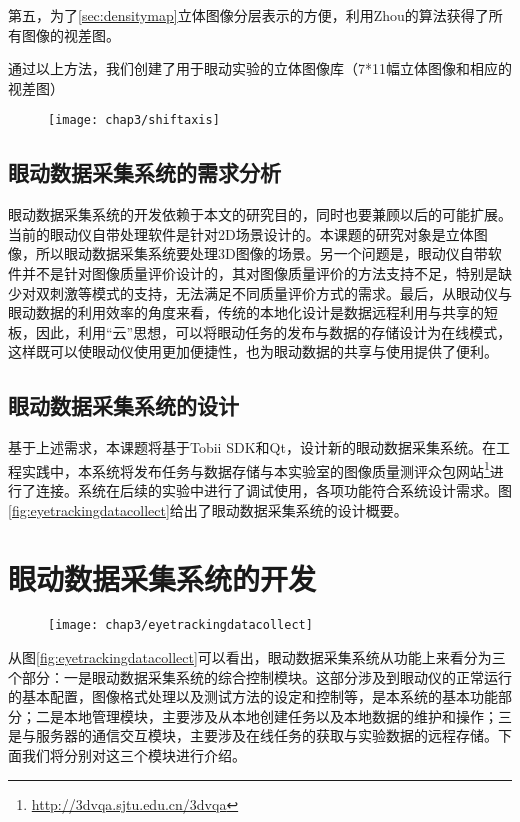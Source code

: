 第五，为了\ref{sec:densitymap}立体图像分层表示的方便，利用Zhou\parencite{zhou2015depth}的算法获得了所有图像的视差图。

通过以上方法，我们创建了用于眼动实验的立体图像库（7*11幅立体图像和相应的视差图）
\begin{figure}[!htp]
  \centering
  \texttt{[image: chap3/shiftaxis]}
\end{figure}
\subsection{眼动数据采集系统的需求分析}
\label{sec:systemrequirement}
眼动数据采集系统的开发依赖于本文的研究目的，同时也要兼顾以后的可能扩展。当前的眼动仪自带处理软件是针对2D场景设计的。本课题的研究对象是立体图像，所以眼动数据采集系统要处理3D图像的场景。另一个问题是，眼动仪自带软件并不是针对图像质量评价设计的，其对图像质量评价的方法支持不足，特别是缺少对双刺激等模式的支持，无法满足不同质量评价方式的需求。最后，从眼动仪与眼动数据的利用效率的角度来看，传统的本地化设计是数据远程利用与共享的短板，因此，利用“云”思想，可以将眼动任务的发布与数据的存储设计为在线模式，这样既可以使眼动仪使用更加便捷性，也为眼动数据的共享与使用提供了便利。

\subsection{眼动数据采集系统的设计}
\label{sec:systemdesigner}
基于上述需求，本课题将基于Tobii SDK和Qt，设计新的眼动数据采集系统。在工程实践中，本系统将发布任务与数据存储与本实验室的图像质量测评众包网站\footnote{\url{http://3dvqa.sjtu.edu.cn/3dvqa}}进行了连接。系统在后续的实验中进行了调试使用，各项功能符合系统设计需求。图\ref{fig:eyetrackingdatacollect}给出了眼动数据采集系统的设计概要。
\section{眼动数据采集系统的开发}
\label{sec:eyetrackdatacollection}
\begin{figure}[!htp]
  \centering
  \texttt{[image: chap3/eyetrackingdatacollect]}
\end{figure}

从图\ref{fig:eyetrackingdatacollect}可以看出，眼动数据采集系统从功能上来看分为三个部分：一是眼动数据采集系统的综合控制模块。这部分涉及到眼动仪的正常运行的基本配置，图像格式处理以及测试方法的设定和控制等，是本系统的基本功能部分；二是本地管理模块，主要涉及从本地创建任务以及本地数据的维护和操作；三是与服务器的通信交互模块，主要涉及在线任务的获取与实验数据的远程存储。下面我们将分别对这三个模块进行介绍。

